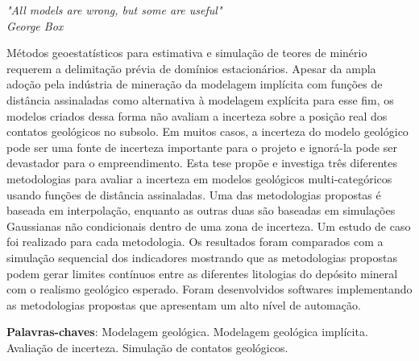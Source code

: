 \documentclass[
    oneside, %
	12pt,				%
	a4paper,			%
	chapter=TITLE,		%
	english,			%
	french,				%
	spanish,			%
	brazil				%
	]{abntex2}
\begin{document}
\begin{epigrafe}
    \vspace*{\fill}
	\begin{flushright}
		\textit{"All models are wrong, but some are useful"\\
		George Box}
	\end{flushright}
\end{epigrafe}


\setlength{\absparsep}{18pt} %
\begin{resumo}
    Métodos geoestatísticos para estimativa e simulação de teores de minério requerem a delimitação prévia de domínios estacionários. Apesar da ampla adoção pela indústria de mineração da modelagem implícita com funções de distância assinaladas como alternativa à modelagem explícita para esse fim, os modelos criados dessa forma não avaliam a incerteza sobre a posição real dos contatos geológicos no subsolo. Em muitos casos, a incerteza do modelo geológico pode ser uma fonte de incerteza importante para o projeto e ignorá-la pode ser devastador para o empreendimento. Esta tese propõe e investiga três diferentes metodologias para avaliar a incerteza em modelos geológicos multi-categóricos usando funções de distância assinaladas. Uma das metodologias propostas é baseada em interpolação, enquanto as outras duas são baseadas em simulações Gaussianas não condicionais dentro de uma zona de incerteza. Um estudo de caso foi realizado para cada metodologia. Os resultados foram comparados com a simulação sequencial dos indicadores mostrando que as metodologias propostas podem gerar limites contínuos entre as diferentes litologias do depósito mineral com o realismo geológico esperado. Foram desenvolvidos softwares implementando as metodologias propostas que apresentam um alto nível de automação.

 \textbf{Palavras-chaves}: Modelagem geológica. Modelagem geológica implícita. Avaliação de incerteza. Simulação de contatos geológicos.
\end{resumo}
\end{document}

